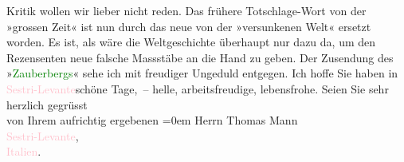                Kritik wollen wir lieber nicht reden. Das frühere Totschlage-Wort von der »grossen
               Zeit« ist nun durch das neue von der »versunkenen Welt« ersetzt worden. Es ist, als
               wäre die Weltgeschichte überhaupt nur dazu da, um den Rezensenten neue falsche
               Massstäbe an die Hand zu geben.\pend
           \pstart
           Der Zusendung des »\textcolor{green}{Zauberbergs}{}\ledrightnote{\textcolor{green}{Der Zauberberg. Roman}}« sehe ich mit
               freudiger Ungeduld entgegen. Ich hoffe Sie haben in \textcolor{pink}{Sestri-Levante}{}\ledrightnote{\textcolor{pink}{Sestri Levante}}{ }schöne Tage, – helle, arbeitsfreudige,
               lebensfrohe.\pend
           \pstart
           Seien Sie sehr herzlich gegrüsst{\\[\baselineskip]}von Ihrem aufrichtig ergebenen\pend
           \leftskip=0em{}\pstart
           \noindent{}Herrn Thomas Mann{\\}\textcolor{pink}{Sestri-Levante}{}\ledrightnote{\textcolor{pink}{Sestri Levante}},{\\}\textcolor{pink}{Italien}{}\ledrightnote{\textcolor{pink}{Italien}}.\pend
           \endnumbering{}  
      